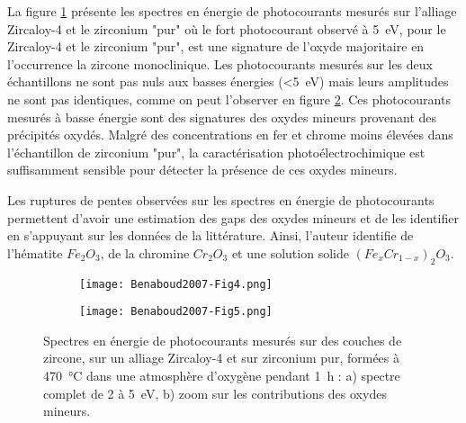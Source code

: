 \begin{refsection}
    La figure \ref{subfig:benaboud_fig4} présente les spectres en énergie de photocourants mesurés sur l'alliage
    Zircaloy-4 et le zirconium "pur" où le fort photocourant observé à 5~eV, pour le Zircaloy-4 et le zirconium "pur",
    est une signature de l'oxyde majoritaire en l'occurrence la zircone monoclinique.
    Les photocourants mesurés sur les deux échantillons ne sont pas nuls aux basses énergies (<5~eV) mais leurs amplitudes 
    ne sont pas identiques, comme on peut l'observer en figure \ref{subfig:benaboud_fig5}.
    Ces photocourants mesurés à basse énergie sont des signatures des oxydes mineurs provenant des précipités oxydés.
    Malgré des concentrations en fer et chrome moins élevées dans l'échantillon de zirconium "pur", la caractérisation
    photoélectrochimique est suffisamment sensible pour détecter la présence de ces oxydes mineurs. 
   
    Les ruptures de pentes observées sur les spectres en énergie de photocourants permettent d'avoir une estimation des gaps des oxydes
    mineurs et de les identifier en s'appuyant sur les données de la littérature.
    Ainsi, l'auteur
    identifie de l'hématite $Fe_2O_3$, de la chromine $Cr_2O_3$ et une solution solide $(Fe_xCr_{1-x})_2O_3$.


    \begin{figure}[H]
        \centering
        \begin{subfigure}[b]{0.65\textwidth}
            \texttt{[image: Benaboud2007-Fig4.png]}
            \caption{}
            \label{subfig:benaboud_fig4}
        \end{subfigure}
        \begin{subfigure}[b]{0.65\textwidth}
            \texttt{[image: Benaboud2007-Fig5.png]}
            \caption{}
            \label{subfig:benaboud_fig5}
        \end{subfigure}
        \caption[Spectres en énergie de photocourants mesurés sur des couches de zircone, sur un alliage
            Zircaloy-4 et sur 
            zirconium pur, formées à \SI{470}{\degreeCelsius} dans une atmosphère d'oxygène pendant 1~h:
            a) spectre complet de 2 à 5~eV, 
            b) zoom sur les contributions des oxydes mineurs.]
        {Spectres en énergie de photocourants mesurés sur des couches de zircone, sur un alliage Zircaloy-4 et sur 
            zirconium pur, formées à \SI{470}{\degreeCelsius} dans une atmosphère d'oxygène pendant 1~h \citep{Benaboud2007}:
            a) spectre complet de 2 à 5~eV, 
            b) zoom sur les contributions des oxydes mineurs.}
        \label{fig:benaboud_application}
    \end{figure}


\end{refsection}

